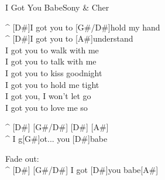 \begin{song}{I Got You Babe}{Sony \& Cher}
\begin{guitar}
^ [D#]I got you to [G#/D#]hold my hand\\
^ [D#]I got you to [A#]understand\\
I got you to walk with me\\
I got you to talk with me\\
I got you to kiss goodnight\\
I got you to hold me tight\\
I got you, I won't let go\\
I got you to love me so\\
\end{guitar}

\begin{guitar}
^ [D#] [G#/D#] [D#] [A#]\\

^ I g[G#]ot... you [D#]babe\\
\end{guitar}

\begin{guitar}
Fade out:\\
^ [D#]    [G#/D#]     I got [D#]you babe[A#]\\
\end{guitar}
\end{song}
